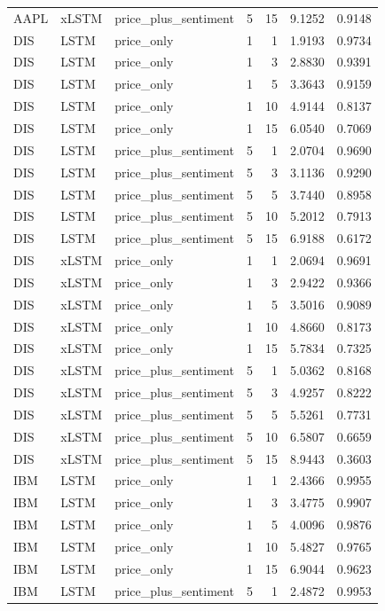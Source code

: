 \begin{longtable}{lllrrrr}
AAPL & xLSTM & price_plus_sentiment & 5 & 15 & 9.1252 & 0.9148 \\
DIS & LSTM & price_only & 1 & 1 & 1.9193 & 0.9734 \\
DIS & LSTM & price_only & 1 & 3 & 2.8830 & 0.9391 \\
DIS & LSTM & price_only & 1 & 5 & 3.3643 & 0.9159 \\
DIS & LSTM & price_only & 1 & 10 & 4.9144 & 0.8137 \\
DIS & LSTM & price_only & 1 & 15 & 6.0540 & 0.7069 \\
DIS & LSTM & price_plus_sentiment & 5 & 1 & 2.0704 & 0.9690 \\
DIS & LSTM & price_plus_sentiment & 5 & 3 & 3.1136 & 0.9290 \\
DIS & LSTM & price_plus_sentiment & 5 & 5 & 3.7440 & 0.8958 \\
DIS & LSTM & price_plus_sentiment & 5 & 10 & 5.2012 & 0.7913 \\
DIS & LSTM & price_plus_sentiment & 5 & 15 & 6.9188 & 0.6172 \\
DIS & xLSTM & price_only & 1 & 1 & 2.0694 & 0.9691 \\
DIS & xLSTM & price_only & 1 & 3 & 2.9422 & 0.9366 \\
DIS & xLSTM & price_only & 1 & 5 & 3.5016 & 0.9089 \\
DIS & xLSTM & price_only & 1 & 10 & 4.8660 & 0.8173 \\
DIS & xLSTM & price_only & 1 & 15 & 5.7834 & 0.7325 \\
DIS & xLSTM & price_plus_sentiment & 5 & 1 & 5.0362 & 0.8168 \\
DIS & xLSTM & price_plus_sentiment & 5 & 3 & 4.9257 & 0.8222 \\
DIS & xLSTM & price_plus_sentiment & 5 & 5 & 5.5261 & 0.7731 \\
DIS & xLSTM & price_plus_sentiment & 5 & 10 & 6.5807 & 0.6659 \\
DIS & xLSTM & price_plus_sentiment & 5 & 15 & 8.9443 & 0.3603 \\
IBM & LSTM & price_only & 1 & 1 & 2.4366 & 0.9955 \\
IBM & LSTM & price_only & 1 & 3 & 3.4775 & 0.9907 \\
IBM & LSTM & price_only & 1 & 5 & 4.0096 & 0.9876 \\
IBM & LSTM & price_only & 1 & 10 & 5.4827 & 0.9765 \\
IBM & LSTM & price_only & 1 & 15 & 6.9044 & 0.9623 \\
IBM & LSTM & price_plus_sentiment & 5 & 1 & 2.4872 & 0.9953 \\

\end{longtable}
